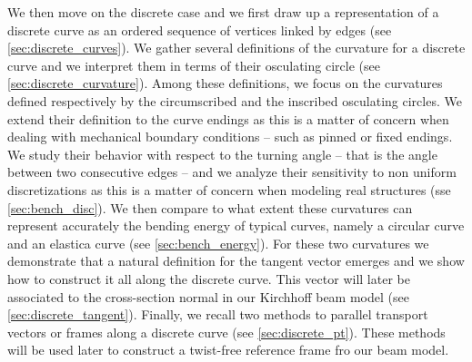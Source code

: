 We then move on the discrete case and we first draw up a representation of a discrete curve as an ordered sequence of vertices linked by edges (see \cref{sec:discrete_curves}). We gather several definitions of the curvature for a discrete curve and we interpret them in terms of their osculating circle (see \cref{sec:discrete_curvature}). Among these definitions, we focus on the curvatures defined respectively by the circumscribed and the inscribed osculating circles. We extend their definition to the curve endings as this is a matter of concern when dealing with mechanical boundary conditions -- such as pinned or fixed endings. We study their behavior with respect to the turning angle -- that is the angle between two consecutive edges -- and we analyze their sensitivity to non uniform discretizations as this is a matter of concern when modeling real structures (sse \cref{sec:bench_disc}). We then compare to what extent these curvatures can represent accurately the bending energy of typical curves, namely a circular curve and an elastica curve (see \cref{sec:bench_energy}). For these two curvatures we demonstrate that a natural definition  for the tangent vector emerges and we show how to construct it all along the discrete curve. This vector will later be associated to the cross-section normal in our Kirchhoff beam model (see \cref{sec:discrete_tangent}). Finally, we recall two methods to parallel transport vectors or frames along a discrete curve (see \cref{sec:discrete_pt}). These methods will be used later to construct a twist-free reference frame fro our beam model.

